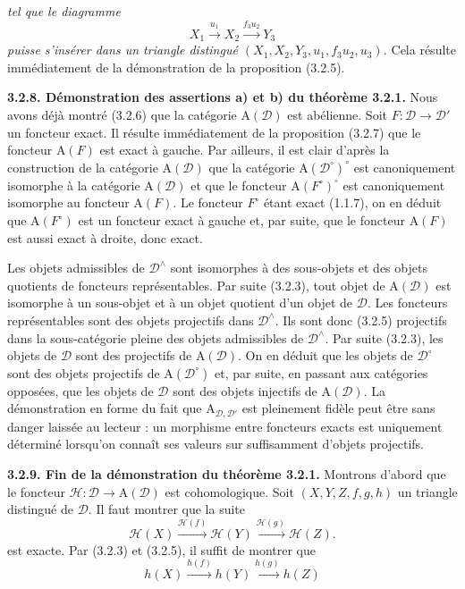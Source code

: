 \clearpage
{}%
\begingroup\small\setlength{\parskip}{0pt}\setlength{\emergencystretch}{1.5em}
\noindent\textit{tel que le diagramme}
\[
X_1\xrightarrow{u_1}X_2\xrightarrow{f_3u_2}Y_3
\]
\textit{puisse s'insérer dans un triangle distingué
$(X_1,X_2,Y_3,u_1,f_3u_2,u_3)$.}
Cela résulte immédiatement de la démonstration de la proposition (3.2.5).

\medskip\noindent\textbf{3.2.8. Démonstration des assertions a) et b) du
théorème 3.2.1.}\quad
Nous avons déjà montré (3.2.6) que la catégorie $\mathrm A(\mathcal D)$ est
abélienne. Soit $F\colon\mathcal D\to\mathcal D'$ un foncteur exact. Il
résulte immédiatement de la proposition (3.2.7) que le foncteur
$\mathrm A(F)$ est exact à gauche. Par ailleurs, il est clair d'après la
construction de la catégorie $\mathrm A(\mathcal D)$ que la catégorie
$\mathrm A(\mathcal D^\circ)^\circ$ est canoniquement isomorphe à la
catégorie $\mathrm A(\mathcal D)$ et que le foncteur
$\mathrm A(F^\circ)^\circ$ est canoniquement isomorphe au foncteur
$\mathrm A(F)$. Le foncteur $F^\circ$ étant exact (1.1.7), on en déduit que
$\mathrm A(F^\circ)$ est un foncteur exact à gauche et, par suite, que le
foncteur $\mathrm A(F)$ est aussi exact à droite, donc exact.

Les objets admissibles de $\mathcal D^\wedge$ sont isomorphes à des
sous-objets et des objets quotients de foncteurs représentables. Par suite
(3.2.3), tout objet de $\mathrm A(\mathcal D)$ est isomorphe à un sous-objet
et à un objet quotient d'un objet de $\mathcal D$. Les foncteurs
représentables sont des objets projectifs dans $\mathcal D^\wedge$. Ils sont
donc (3.2.5) projectifs dans la sous-catégorie pleine des objets admissibles
de $\mathcal D^\wedge$. Par suite (3.2.3), les objets de $\mathcal D$ sont
des projectifs de $\mathrm A(\mathcal D)$. On en déduit que les objets de
$\mathcal D^\circ$ sont des objets projectifs de
$\mathrm A(\mathcal D^\circ)$ et, par suite, en passant aux catégories
opposées, que les objets de $\mathcal D$ sont des objets injectifs de
$\mathrm A(\mathcal D)$. La démonstration en forme du fait que
$\mathrm A_{\mathcal D,\mathcal D'}$ est pleinement fidèle peut être sans
danger laissée au lecteur : un morphisme entre foncteurs exacts est
uniquement déterminé lorsqu'on connaît ses valeurs sur suffisamment d'objets
projectifs.

\medskip\noindent\textbf{3.2.9. Fin de la démonstration du théorème 3.2.1.}
Montrons d'abord que le foncteur
$\mathcal H\colon\mathcal D\to\mathrm A(\mathcal D)$ est cohomologique. Soit
$(X,Y,Z,f,g,h)$ un triangle distingué de $\mathcal D$. Il faut montrer que la suite
\[
\mathcal H(X)\xrightarrow{\mathcal H(f)}\mathcal H(Y)
\xrightarrow{\mathcal H(g)}\mathcal H(Z).
\]
est exacte.
Par (3.2.3) et (3.2.5), il suffit de montrer que
\[
h(X)\xrightarrow{h(f)}h(Y)\xrightarrow{h(g)}h(Z)
\tag{3.2.9.1}
\]
\endgroup
